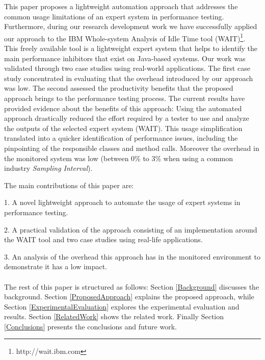 \documentclass[runningheads,a4paper]{llncs}
\begin{document}
This paper proposes a lightweight automation approach that addresses the common
usage limitations of an expert system in performance testing. Furthermore,
during our research development work we have successfully applied our approach to 
the IBM Whole-system Analysis of Idle Time tool
(WAIT)\footnote{http://wait.ibm.com}. This freely available tool is a
lightweight expert system that helps to identify the main performance inhibitors
that exist on Java-based systems. Our work was validated through two case studies 
using real-world applications. The first case study concentrated in
evaluating that the overhead introduced by our approach was low. The second
assessed the productivity benefits that the proposed approach brings to the
performance testing process. The current results have provided evidence about
the benefits of this approach: Using the automated approach drastically reduced
the effort required by a tester to use and analyze the outputs of the selected
expert system (WAIT). This usage simplification translated into a quicker identification
of performance issues, including the pinpointing of the responsible classes and
method calls. Moreover the overhead in the monitored system was low (between 0\%
to 3\% when using a common industry \emph{Sampling Interval}).

The main contributions of this paper are: 

1. A novel lightweight approach to automate the usage of expert systems in
performance testing.

2. A practical validation of the approach consisting of an implementation
around the WAIT tool and two case studies using real-life applications.

3. An analysis of the overhead this approach has in the monitored environment to
demonstrate it has a low impact.
\\\\
The rest of this paper is structured as follows: Section \ref{Background}
discusses the background. Section \ref{ProposedApproach} explains the proposed approach, while Section
\ref{ExperimentalEvaluation} explores the experimental evaluation and results.
Section \ref{RelatedWork} shows the related work. Finally Section
\ref{Conclusions} presents the conclusions and future work.


\vspace{-5pt}
\end{document}
